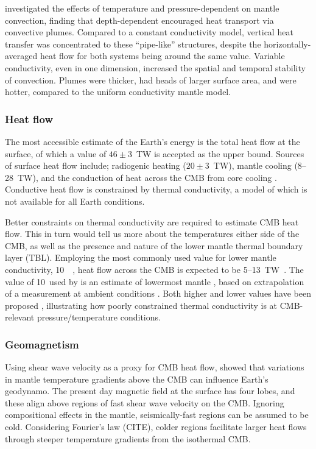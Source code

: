 \citet{Dubuffet2000} investigated the effects of temperature and pressure-dependent \tcs on mantle convection, finding that depth-dependent \tcs encouraged heat transport via convective plumes. Compared to a constant conductivity model, vertical heat transfer was concentrated to these ``pipe-like'' structures, despite the horizontally-averaged heat flow for both systems being around the same value. Variable conductivity, even in one dimension, increased the spatial and temporal stability of convection. Plumes were thicker, had heads of larger surface area, and were hotter, compared to the uniform conductivity mantle model.

\subsubsection{Heat flow}

The most accessible estimate of the Earth's energy is the total heat flow at the surface, of which a value of $46\pm3$~TW is accepted as the upper bound. Sources of surface heat flow include; radiogenic heating ($20\pm3$~TW), mantle cooling (8--28~TW), and the conduction of heat across the CMB from core cooling \citep{Lay2008}. Conductive heat flow is constrained by thermal conductivity, a model of which is not available for all Earth conditions.

Better constraints on thermal conductivity are required to estimate CMB heat flow. This in turn would tell us more about the temperatures either side of the CMB, as well as the presence and nature of the lower mantle thermal boundary layer (TBL). Employing the most commonly used value for lower mantle conductivity, 10~\wmk~\citep{Lay2008}, heat flow across the CMB is expected to be 5--13~TW~\citep{Lay2008}. The value of 10~\wmk used by \citet{Lay2006} is an estimate of lowermost mantle \tc, based on extrapolation of a measurement at ambient conditions \citep{Osako1991}. Both higher and lower values have been proposed \citep[4--16~\wmk,][]{Manthilake2011}, illustrating how poorly constrained thermal conductivity is at CMB-relevant pressure/temperature conditions.

\subsubsection{Geomagnetism}

Using shear wave velocity as a proxy for CMB heat flow, \citet{Gubbins2007} showed that variations in mantle temperature gradients above the CMB can influence Earth's geodynamo. The present day magnetic field at the surface has four lobes, and these align above regions of fast shear wave velocity on the CMB. Ignoring compositional effects in the mantle, seismically-fast regions can be assumed to be cold. Considering Fourier's law (CITE), colder regions facilitate larger heat flows through steeper temperature gradients from the isothermal CMB.

